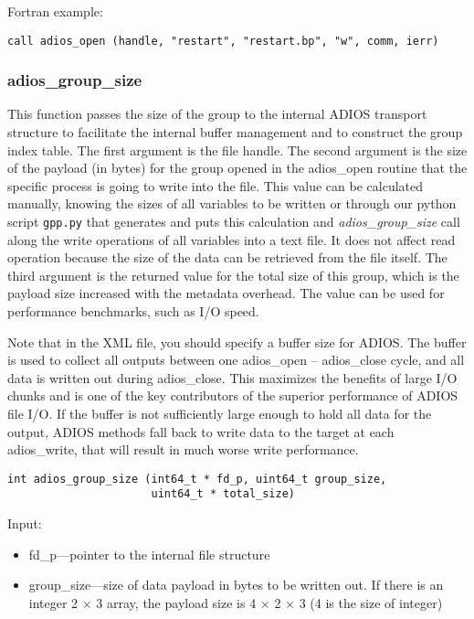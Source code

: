 Fortran example: 
\begin{lstlisting}[alsolanguage=Fortran]
call adios_open (handle, "restart", "restart.bp", "w", comm, ierr)
\end{lstlisting}

\subsubsection{adios\_group\_size}
This function passes the size of the group to the internal ADIOS transport structure 
to facilitate the internal buffer management and to construct the group index table. 
The first argument is the file handle. The second argument is the size of the payload 
(in bytes) for the group opened in the adios\_open routine that the specific process 
is going to write into the file. 
This value can be calculated manually, knowing the sizes of all variables to be written 
or through our python script \verb+gpp.py+ that generates and puts this calculation 
and \textit{adios\_group\_size} call along the write operations of all variables into 
a text file. It does not affect read operation because the size 
of the data can be retrieved from the file itself. The third argument is the returned 
value for the total size of this group, which is the payload size increased with the 
metadata overhead. The value can be used for performance benchmarks, such as I/O speed. 

Note that in the XML file, you should specify a buffer size for ADIOS. The buffer is 
used to collect all outputs between one adios\_open -- adios\_close cycle, and all data
is written out during adios\_close. This maximizes the benefits of large I/O chunks and
is one of the key contributors of the superior performance of ADIOS file I/O. 
If the buffer is not sufficiently large enough to hold all data for the output,
ADIOS methods fall back to write data to the target at each adios\_write, that will
result in much worse write performance.

\begin{lstlisting}[alsolanguage=C]
int adios_group_size (int64_t * fd_p, uint64_t group_size, 
                      uint64_t * total_size)
\end{lstlisting}

Input: 
\begin{itemize}
\item fd\_p---pointer to the internal file structure
\item group\_size---size of data payload in bytes to be written out. If there is an integer 
2 $\times$ 3 array, the payload size is 4 $\times$ 2 $\times$ 3 (4 is the size of integer)
\end{itemize}

